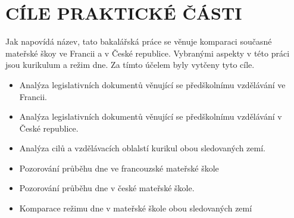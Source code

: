 \chapter{CÍLE PRAKTICKÉ ČÁSTI}
Jak napovídá název, tato bakalářská práce se věnuje komparaci současné mateřské škoy ve Francii a v České republice. Vybranými aspekty v této práci jsou kurikulum a režim dne. Za tímto účelem byly vytčeny tyto cíle.

\begin{itemize}
	\setlength\itemsep{-2mm}
	\item [] Analýza legislativních dokumentů věnující se předškolnímu vzdělávání ve Francii.
	\item [] Analýza legislativních dokumentů věnující se předškolnímu vzdělávání v České republice.
	\item [] Analýza cilů a vzdělávacích oblalstí kurikul obou sledovaných zemí.
	\item [] Pozorování průběhu dne ve francouzské mateřské škole
	\item [] Pozorování průběhu dne v české mateřské škole. 
	\item [] Komparace režimu dne v mateřské škole obou sledovaných zemí
\end{itemize}


